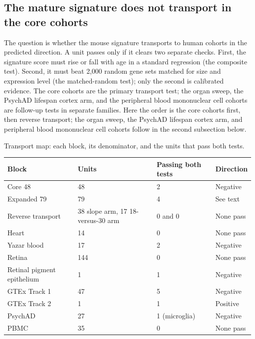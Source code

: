 \documentclass[11pt]{article}
\begin{document}
\subsection*{The mature signature does not transport in the core cohorts}

The question is whether the mouse signature transports to human cohorts in the predicted direction. A unit passes only if it clears two separate checks. First, the signature score must rise or fall with age in a standard regression (the composite test). Second, it must beat 2,000 random gene sets matched for size and expression level (the matched-random test); only the second is calibrated evidence. The core cohorts are the primary transport test; the organ sweep, the PsychAD lifespan cortex arm, and the peripheral blood mononuclear cell cohorts are follow-up tests in separate families. Here the order is the core cohorts first, then reverse transport; the organ sweep, the PsychAD lifespan cortex arm, and peripheral blood mononuclear cell cohorts follow in the second subsection below.


Transport map: each block, its denominator, and the units that pass both tests.
{\scriptsize\begin{tabular}{p{}p{}p{}p{}}
Block & Units & Passing both tests & Direction \\ \hline
Core 48 & 48 & 2 & Negative \\
Expanded 79 & 79 & 4 & See text \\
Reverse transport & 38 slope arm, 17 18-versus-30 arm & 0 and 0 & None pass \\
Heart & 14 & 0 & None pass \\
Yazar blood & 17 & 2 & Negative \\
Retina & 144 & 0 & None pass \\
Retinal pigment epithelium & 1 & 1 & Negative \\
GTEx Track 1 & 47 & 5 & Negative \\
GTEx Track 2 & 1 & 1 & Positive \\
PsychAD & 27 & 1 (microglia) & Negative \\
PBMC & 35 & 0 & None pass \\
\end{tabular}}
\end{document}

